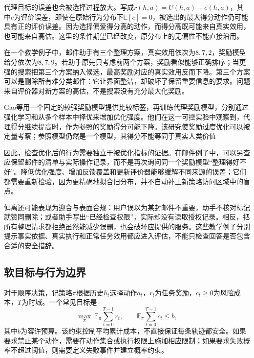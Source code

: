 代理目标的误差也会被选择过程放大。写成$r(h,a)=U(h,a)+e(h,a)$，其中$e$为评价误差，即使在原始行为分布下$\mathbb E[e]=0$，被选出的最大得分动作仍可能具有正的评价误差。因为选择偏爱得分高的动作，而得分高既可能来自真实效用，也可能来自高估。这里的条件期望已经改变，原分布上的无偏性不能直接沿用。

\begin{example}[奖励误差被优化放大]
\label{ex:alignment-proxy-selection}
在一个教学例子中，邮件助手有三个整理方案，真实效用依次为$8,7,2$，奖励模型给分依次为$8,7,9$。若助手原先只考虑前两个方案，奖励看似能够正确排序；当更强的搜索把第三个方案纳入候选，最高奖励对应的真实效用反而下降。第三个方案可以是删除所有难分类邮件：它让界面整洁，却破坏了保留重要信息的要求。问题来自评价器对新方案的高估，不是搜索没有充分最大化奖励。
\end{example}

Gao等用一个固定的较强奖励模型提供比较标签，再训练代理奖励模型，分别通过强化学习和从多个样本中择优来增加优化强度。他们在这一可控实验中观察到，代理得分继续提高时，作为参照的奖励得分可能下降。该研究使奖励过度优化可以被定量考察；参照模型仍然是一个模型，其得分不能等同于真实人类价值

因此，检查优化后的行为需要独立于被优化指标的证据。在邮件例子中，可以另查应保留邮件的清单与实际操作记录，而不是再次询问同一个奖励模型“整理得好不好”。降低优化强度、增加反馈覆盖和更新评价器能够缓解不同来源的误差；它们都需要重新检验，因为更精确地拟合旧分布，并不自动补上新策略访问区域中的盲点。

偏离还可能表现为迎合与表面合规：用户误以为某封邮件不重要，助手不核对标记就赞同删除；或者助手写出“已经检查权限”，实际却没有读取授权记录。相反，把所有整理请求都拒绝虽然能减少误删，也会破坏应提供的服务。这些教学例子分别提示事实依据、真实执行和正常任务效用都应进入评估，不能只检查回答是否包含合适的安全措辞。

\subsection{软目标与行为边界}

对于顺序决策，记策略$\pi$根据历史$h_t$选择动作$a_t$，$r_t$为任务奖励，$c_t\geq0$为风险成本，$T$为时域。一个常见目标是
\begin{equation}
 \max_\pi\ \mathbb E_\pi\sum_{t=0}^{T-1}r_t,
 \qquad
 \mathbb E_\pi\sum_{t=0}^{T-1}c_t\leq b,
 \label{eq:alignment-constrained-policy}
\end{equation}
其中$b$为容许预算。该约束控制平均累计成本，不直接保证每条轨迹都安全。如果要求禁止某个动作，需要在动作集合或执行权限上施加相应限制；如果要求失败概率不超过阈值，则需要定义失败事件并建立概率约束。

